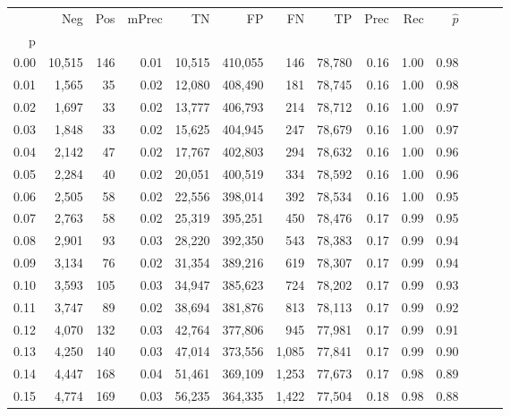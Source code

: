 \begin{tabular}{rrrrrrrrrrrrrr}
\toprule
{} &     Neg &    Pos & mPrec &       TN &       FP &      FN &      TP &  Prec &   Rec & $\hat{p}$ \\
p    &         &        &       &          &          &         &         &       &       &           \\
\midrule
0.00 &  10,515 &    146 &  0.01 &   10,515 &  410,055 &     146 &  78,780 &  0.16 &  1.00 &      0.98 \\
0.01 &   1,565 &     35 &  0.02 &   12,080 &  408,490 &     181 &  78,745 &  0.16 &  1.00 &      0.98 \\
0.02 &   1,697 &     33 &  0.02 &   13,777 &  406,793 &     214 &  78,712 &  0.16 &  1.00 &      0.97 \\
0.03 &   1,848 &     33 &  0.02 &   15,625 &  404,945 &     247 &  78,679 &  0.16 &  1.00 &      0.97 \\
0.04 &   2,142 &     47 &  0.02 &   17,767 &  402,803 &     294 &  78,632 &  0.16 &  1.00 &      0.96 \\
0.05 &   2,284 &     40 &  0.02 &   20,051 &  400,519 &     334 &  78,592 &  0.16 &  1.00 &      0.96 \\
0.06 &   2,505 &     58 &  0.02 &   22,556 &  398,014 &     392 &  78,534 &  0.16 &  1.00 &      0.95 \\
0.07 &   2,763 &     58 &  0.02 &   25,319 &  395,251 &     450 &  78,476 &  0.17 &  0.99 &      0.95 \\
0.08 &   2,901 &     93 &  0.03 &   28,220 &  392,350 &     543 &  78,383 &  0.17 &  0.99 &      0.94 \\
0.09 &   3,134 &     76 &  0.02 &   31,354 &  389,216 &     619 &  78,307 &  0.17 &  0.99 &      0.94 \\
0.10 &   3,593 &    105 &  0.03 &   34,947 &  385,623 &     724 &  78,202 &  0.17 &  0.99 &      0.93 \\
0.11 &   3,747 &     89 &  0.02 &   38,694 &  381,876 &     813 &  78,113 &  0.17 &  0.99 &      0.92 \\
0.12 &   4,070 &    132 &  0.03 &   42,764 &  377,806 &     945 &  77,981 &  0.17 &  0.99 &      0.91 \\
0.13 &   4,250 &    140 &  0.03 &   47,014 &  373,556 &   1,085 &  77,841 &  0.17 &  0.99 &      0.90 \\
0.14 &   4,447 &    168 &  0.04 &   51,461 &  369,109 &   1,253 &  77,673 &  0.17 &  0.98 &      0.89 \\
0.15 &   4,774 &    169 &  0.03 &   56,235 &  364,335 &   1,422 &  77,504 &  0.18 &  0.98 &      0.88 \\

\end{tabular}
